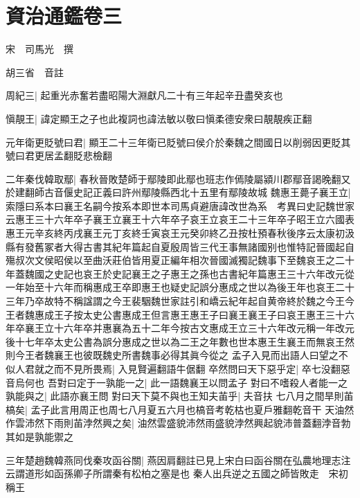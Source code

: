 \section{資治通鑑卷三}
宋　司馬光　撰

胡三省　音註

周紀三|{
	起重光赤奮若盡昭陽大淵獻凡二十有三年起辛丑盡癸亥也}


愼靚王|{
	諱定顯王之子也此複詞也諱法敏以敬曰愼柔德安衆曰靚靚疾正翻}


元年衛更貶號曰君|{
	顯王二十三年衛已貶號曰侯介於秦魏之間國日以削弱因更貶其號曰君更居孟翻貶悲檢翻}


二年秦伐韓取鄢|{
	春秋晉敗楚師于鄢陵即此鄢也班志作傿陵屬潁川郡鄢音謁晚翻又於建翻師古音偃史記正義曰許州鄢陵縣西北十五里有鄢陵故城}
魏惠王薨子襄王立|{
	索隱曰系本曰襄王名嗣今按系本即世本司馬貞避唐諱改世為系　考異曰史記魏世家云惠王三十六年卒子襄王立襄王十六年卒子哀王立哀王二十三年卒子昭王立六國表惠王元辛亥終丙戌襄王元丁亥終壬寅哀王元癸卯終乙丑按杜預春秋後序云太康初汲縣有發舊冢者大得古書其紀年篇起自夏殷周皆三代王事無諸國别也惟特記晉國起自殤叔次文侯昭侯以至曲沃莊伯皆用夏正編年相次晉國滅獨記魏事下至魏哀王之二十年蓋魏國之史記也哀王於史記襄王之子惠王之孫也古書紀年篇惠王三十六年改元從一年始至十六年而稱惠成王卒即惠王也疑史記誤分惠成之世以為後王年也哀王二十三年乃卒故特不稱諡謂之今王裴駰魏世家註引和嶠云紀年起自黄帝終於魏之今王今王者魏惠成王子按太史公書惠成王但言惠王惠王子曰襄王襄王子曰哀王惠王三十六年卒襄王立十六年卒并惠襄為五十二年今按古文惠成王立三十六年改元稱一年改元後十七年卒太史公書為誤分惠成之世以為二王之年數也世本惠王生襄王而無哀王然則今王者魏襄王也彼既魏史所書魏事必得其眞今從之}
孟子入見而出語人曰望之不似人君就之而不見所畏焉|{
	入見賢遍翻語牛倨翻}
卒然問曰天下惡乎定|{
	卒七没翻惡音烏何也}
吾對曰定于一孰能一之|{
	此一語魏襄王以問孟子}
對曰不嗜殺人者能一之孰能與之|{
	此語亦襄王問}
對曰天下莫不與也王知夫苖乎|{
	夫音扶}
七八月之間旱則苖槁矣|{
	孟子此言用周正也周七八月夏五六月也槁音考乾枯也夏戶雅翻乾音干}
天油然作雲沛然下雨則苖浡然興之矣|{
	油然雲盛貌沛然雨盛貌浡然興起貌沛普蓋翻浡音勃}
其如是孰能禦之

三年楚趙魏韓燕同伐秦攻函谷關|{
	燕因肩翻註已見上宋白曰函谷關在弘農地理志注云謂道形如函孫卿子所謂秦有松柏之塞是也}
秦人出兵逆之五國之師皆敗走　宋初稱王

